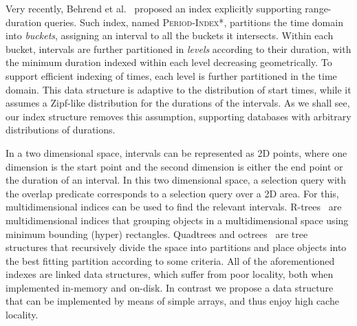 \documentclass[sigconf,nonacm,anonymous]{acmart}
\theoremstyle{definition}
\newcommand{\algo}[1]{\textsc{#1}}
\begin{document}
Very recently, Behrend et al.~\cite{BehrendDGSVRK_SSTD19_period-index}
proposed an index explicitly supporting range-duration queries. Such index,
named \algo{Period-Index*}, partitions the time domain into \emph{buckets},
assigning an interval to all the buckets it intersects. Within each bucket,
intervals are further partitioned in \emph{levels} according to their
duration, with the minimum duration indexed within each level decreasing
geometrically. To support efficient indexing of times, each level is further
partitioned in the time domain. This data structure is adaptive to the
distribution of start times, while it assumes a Zipf-like distribution for
the durations of the intervals. As we shall see, our index structure removes
this assumption, supporting databases with arbitrary distributions of
durations.

In a two dimensional space, intervals can be represented as 2D points, where one dimension is the start point and the second dimension is either the end point or the duration of an interval. In this two dimensional space, a selection query with the overlap predicate corresponds to a selection query over a 2D area. For this, multidimensional indices can be used to find the relevant intervals. R-trees~\cite{DBLP:conf/sigmod/BeckmannKSS90,DBLP:journals/talg/ArgeBHY08} are multidimensional indices that grouping objects in a multidimensional space using minimum bounding (hyper) rectangles. Quadtrees and octrees~\cite{DBLP:journals/acta/FinkelB74,Ulrich00,Samet05} are tree structures that recursively divide the space into partitions and place objects into the best fitting partition according to some criteria.
All of the aforementioned indexes are linked data structures, 
which suffer from poor locality, both when implemented in-memory and on-disk.
In contrast we propose a data structure that can be implemented by means of 
simple arrays, and thus enjoy high cache locality.

\end{document}

